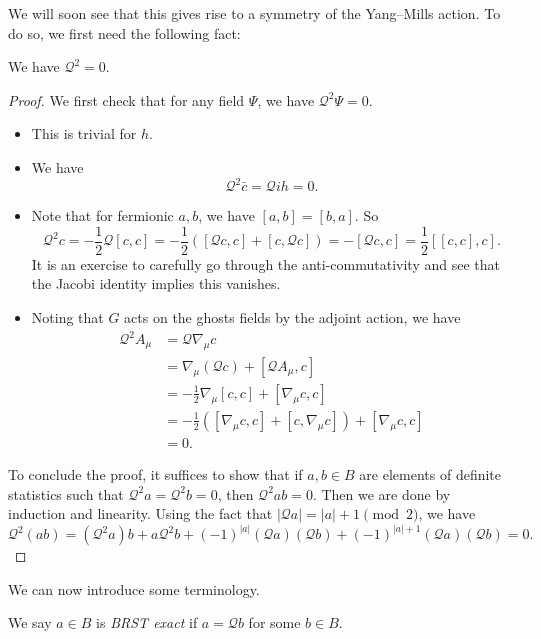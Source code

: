 \documentclass[a4paper]{article}
\begin{document}
We will soon see that this gives rise to a symmetry of the Yang--Mills action. To do so, we first need the following fact:
\begin{thm}
  We have $\mathcal{Q}^2 = 0$.
\end{thm}

\begin{proof}
  We first check that for any field $\Psi$, we have $\mathcal{Q}^2 \Psi = 0$.
  \begin{itemize}
    \item This is trivial for $h$.
    \item We have
      \[
        \mathcal{Q}^2 \bar{c} = \mathcal{Q}i h = 0.
      \]
    \item Note that for fermionic $a, b$, we have $[a, b] = [b, a]$. So
      \[
        \mathcal{Q}^2 c = -\frac{1}{2} \mathcal{Q} [c, c] = -\frac{1}{2} ([\mathcal{Q} c, c] + [c, \mathcal{Q} c]) = -[\mathcal{Q}c, c] = \frac{1}{2} [[c, c], c].
      \]
      It is an exercise to carefully go through the anti-commutativity and see that the Jacobi identity implies this vanishes.
    \item Noting that $G$ acts on the ghosts fields by the adjoint action, we have
      \begin{align*}
        \mathcal{Q}^2 A_\mu &= \mathcal{Q} \nabla_\mu c \\
        &= \nabla_\mu (\mathcal{Q} c) + [\mathcal{Q} A_\mu, c]\\
        &= - \frac{1}{2} \nabla_\mu [c, c] + [\nabla_\mu c, c]\\
        &= - \frac{1}{2} ([\nabla_\mu c, c] + [c, \nabla_\mu c]) + [\nabla_\mu c, c]\\
        &= 0.
      \end{align*}
  \end{itemize}
  To conclude the proof, it suffices to show that if $a, b \in B$ are elements of definite statistics such that $\mathcal{Q}^2 a = \mathcal{Q}^2 b = 0$, then $\mathcal{Q}^2 ab = 0$. Then we are done by induction and linearity. Using the fact that $|\mathcal{Q} a| = |a| + 1 \pmod 2$, we have
  \[
    \mathcal{Q}^2 (ab) = (\mathcal{Q}^2 a) b + a \mathcal{Q}^2 b + (-1)^{|a|} (\mathcal{Q} a) (\mathcal{Q} b) + (-1)^{|a| + 1} (\mathcal{Q} a) (\mathcal{Q} b) = 0.
  \]
\end{proof}

We can now introduce some terminology.
\begin{defi}
  We say $a \in B$ is \emph{BRST exact} if $a = \mathcal{Q} b$ for some $b \in B$.
\end{defi}
\end{document}
